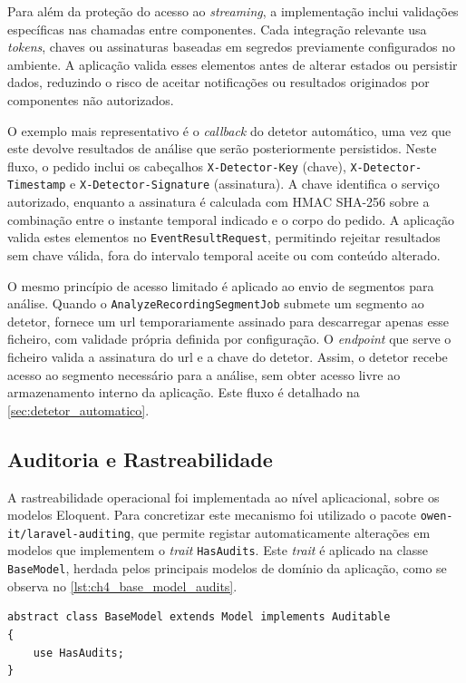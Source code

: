 Para além da proteção do acesso ao \textit{streaming}, a implementação inclui validações específicas nas chamadas entre componentes. Cada integração relevante usa \textit{tokens}, chaves ou assinaturas baseadas em segredos previamente configurados no ambiente. A aplicação valida esses elementos antes de alterar estados ou persistir dados, reduzindo o risco de aceitar notificações ou resultados originados por componentes não autorizados.

O exemplo mais representativo é o \textit{callback} do detetor automático, uma vez que este devolve resultados de análise que serão posteriormente persistidos. Neste fluxo, o pedido inclui os cabeçalhos \texttt{X-Detector-Key} (chave), \texttt{X-Detector-Timestamp} e \texttt{X-Detector-Signature} (assinatura). A chave identifica o serviço autorizado, enquanto a assinatura é calculada com \gls{HMAC} SHA-256 sobre a combinação entre o instante temporal indicado e o corpo do pedido. A aplicação valida estes elementos no \texttt{EventResultRequest}, permitindo rejeitar resultados sem chave válida, fora do intervalo temporal aceite ou com conteúdo alterado.

O mesmo princípio de acesso limitado é aplicado ao envio de segmentos para análise. Quando o \texttt{AnalyzeRecordingSegmentJob} submete um segmento ao detetor, fornece um url temporariamente assinado para descarregar apenas esse ficheiro, com validade própria definida por configuração. O \textit{endpoint} que serve o ficheiro valida a assinatura do url e a chave do detetor. Assim, o detetor recebe acesso ao segmento necessário para a análise, sem obter acesso livre ao armazenamento interno da aplicação. Este fluxo é detalhado na \autoref{sec:detetor_automatico}.

\subsection{Auditoria e Rastreabilidade}

A rastreabilidade operacional foi implementada ao nível aplicacional, sobre os modelos Eloquent. Para concretizar este mecanismo foi utilizado o pacote \texttt{owen-it/laravel-auditing}, que permite registar automaticamente alterações em modelos que implementem o \textit{trait} \texttt{HasAudits}. Este \textit{trait} é aplicado na classe \texttt{BaseModel}, herdada pelos principais modelos de domínio da aplicação, como se observa no \autoref{lst:ch4_base_model_audits}.

\par\noindent\begin{minipage}{\linewidth}
\begin{lstlisting}[caption={Aplicação do \textit{trait} de auditoria na classe base dos modelos (php)},label={lst:ch4_base_model_audits}]
abstract class BaseModel extends Model implements Auditable
{
    use HasAudits;
}
\end{lstlisting}
\end{minipage}

